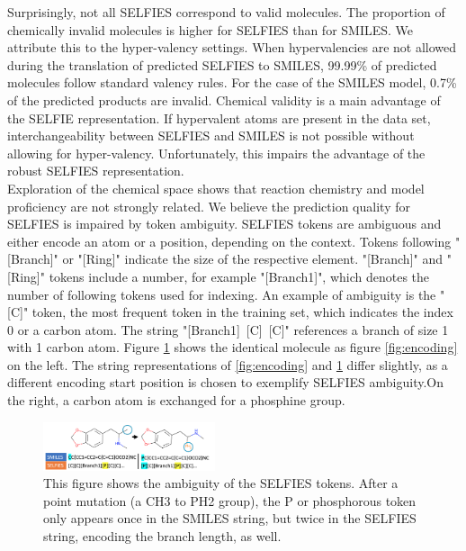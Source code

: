 \documentclass[10pt,conference,compsocconf]{IEEEtran}
\begin{document}
Surprisingly, not all SELFIES correspond to valid molecules. The proportion of chemically invalid molecules is higher for SELFIES than for SMILES. We attribute this to the hyper-valency settings. When hypervalencies are not allowed during the translation of predicted SELFIES to SMILES, 99.99\% of predicted molecules follow standard valency rules. For the case of the SMILES model, 0.7\% of the predicted products are invalid. Chemical validity is a main advantage of the SELFIE representation. If hypervalent atoms are present in the data set, interchangeability between SELFIES and SMILES is not possible without allowing for hyper-valency. Unfortunately, this impairs the advantage of the robust SELFIES representation.\\

Exploration of the chemical space shows that reaction chemistry and model proficiency are not strongly related. We believe the prediction quality for SELFIES is impaired by token ambiguity. SELFIES tokens are ambiguous and either encode an atom or a position, depending on the context. Tokens following "[Branch]" or "[Ring]" indicate the size of the respective element. "[Branch]" and "[Ring]" tokens include a number, for example "[Branch1]", which denotes the number of following tokens used for indexing. An example of ambiguity is the "[C]" token, the most frequent token in the training set, which indicates the index 0 or a carbon atom. The string "[Branch1]~[C]~[C]" references a branch of size 1 with 1 carbon atom. Figure \ref{fig:SELFIESbad} shows the identical molecule as figure \ref{fig:encoding} on the left. The string representations of \ref{fig:encoding} and \ref{fig:SELFIESbad} differ slightly, as a different encoding start position is chosen to exemplify SELFIES ambiguity.\footnotemark On the right, a carbon atom is exchanged for a phosphine group.\\

\begin{figure}[h!]
  \includegraphics[width=0.45\textwidth]{figures/encode_C_P.png}
  \caption[]{This figure shows the ambiguity of the SELFIES tokens. After a point mutation (a CH3 to PH2 group), the P or phosphorous token only appears once in the SMILES string, but twice in the SELFIES string, encoding the branch length, as well.}
  \label{fig:SELFIESbad}
\end{figure}
\end{document}
